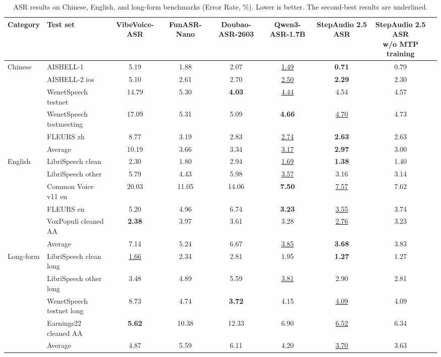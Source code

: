 \documentclass{llmxive}
\begin{document}
\begin{table}[tbp]
\centering
\small
\setlength{\tabcolsep}{3.2pt}
\begin{adjustbox}{max width=\textwidth}
\begin{tabular}{llcccccc>{\arraybackslash}c}
\toprule
Category & Test set & VibeVoice-ASR & FunASR-Nano & Doubao-ASR-2603 & Qwen3-ASR-1.7B & StepAudio 2.5 ASR & \makecell{StepAudio 2.5 ASR\\w/o MTP training} \\
\midrule
\multirow{6}{*}{Chinese}
& AISHELL-1 & 5.19 & 1.88 & 2.07 & \underline{1.49} & \textbf{0.71} & 0.79 \\
& AISHELL-2 ios & 5.10 & 2.61 & 2.70 & \underline{2.50} & \textbf{2.29} & 2.30 \\
& WenetSpeech testnet & 14.79 & 5.30 & \textbf{4.03} & \underline{4.44} & 4.54 & 4.57 \\
& WenetSpeech testmeeting & 17.09 & 5.31 & 5.09 & \textbf{4.66} & \underline{4.70} & 4.73 \\
& FLEURS zh & 8.77 & 3.19 & 2.83 & \underline{2.74} & \textbf{2.63} & 2.63 \\
\cmidrule(lr){2-8}
& Average & 10.19 & 3.66 & 3.34 & \underline{3.17} & \textbf{2.97} & 3.00 \\
\midrule
\multirow{6}{*}{English}
& LibriSpeech clean & 2.30 & 1.80 & 2.94 & \underline{1.69} & \textbf{1.38} & 1.40 \\
& LibriSpeech other & 5.79 & 4.43 & 5.98 & \underline{3.57} & 3.16 & 3.14 \\
& Common Voice v11 en & 20.03 & 11.05 & 14.06 & \textbf{7.50} & \underline{7.57} & 7.62 \\
& FLEURS en & 5.20 & 4.96 & 6.74 & \textbf{3.23} & \underline{3.55} & 3.74 \\
& VoxPopuli cleaned AA & \textbf{2.38} & 3.97 & 3.61 & 3.28 & \underline{2.76} & 3.23 \\
\cmidrule(lr){2-8}
& Average & 7.14 & 5.24 & 6.67 & \underline{3.85} & \textbf{3.68} & 3.83 \\
\midrule
\multirow{5}{*}{Long-form}
& LibriSpeech clean long & \underline{1.66} & 2.34 & 2.81 & 1.95 & \textbf{1.27} & 1.27 \\
& LibriSpeech other long & 3.48 & 4.89 & 5.59 & \underline{3.81} & 2.90 & 2.81 \\
& WenetSpeech testnet long & 8.73 & 4.74 & \textbf{3.72} & 4.15 & \underline{4.09} & 4.09 \\
& Earnings22 cleaned AA & \textbf{5.62} & 10.38 & 12.33 & 6.90 & \underline{6.52} & 6.34 \\
\cmidrule(lr){2-8}
& Average & 4.87 & 5.59 & 6.11 & 4.20 & \underline{3.70} & 3.63 \\
\bottomrule
\end{tabular}
\end{adjustbox}
\caption{ASR results on Chinese, English, and long-form benchmarks (Error Rate, \%). Lower is better. The second-best results are underlined.}
\label{tab:asr_results}
\end{table}
\end{document}
